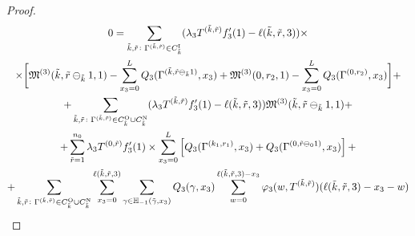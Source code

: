 \documentclass{report}
\begin{document}
\begin{proof}
\begin{multline}
\allowdisplaybreaks
 0 = \sum_{\tilde{k},\tilde{r}\colon \Gamma^{(\tilde{k}, \tilde{r})} \in C_{\tilde{k}}^{\mathrm{I}}} (\lambda_3 T^{(\tilde{k},\tilde{r})} f_3'(1) - \ell(\tilde{k},\tilde{r},3))\times \\ 
     \times \biggl[\mathfrak{M}^{(3)}(\tilde{k},\tilde{r}\ominus_{\tilde{k}} 1,1) - \sum_{x_3=0}^L Q_3(\Gamma^{(\tilde{k},\tilde{r}\ominus_{\tilde{k}} 1)},x_3)   +  \mathfrak{M}^{(3)}(0,r_2,1) -   \sum_{x_3=0}^L  Q_3(\Gamma^{(0,r_2)},x_3)  \biggr]
 +\\+ \sum_{\tilde{k},\tilde{r}\colon \Gamma^{(\tilde{k}, \tilde{r})} \in C_{\tilde{k}}^{\mathrm{O}}\cup C_{\tilde{k}}^{\mathrm{N}}} (\lambda_3 T^{(\tilde{k},\tilde{r})} f_3'(1) - \ell(\tilde{k},\tilde{r},3)) \mathfrak{M}^{(3)}(\tilde{k},\tilde{r}\ominus_{\tilde{k}} 1,1)   +\\+ \sum_{\tilde{r}=1}^{n_0} \lambda_3 T^{(0,\tilde{r})} f_3'(1)  \times \sum_{x_3=0}^{L} \left[ Q_3(\Gamma^{(k_1,r_1)},x_3) + Q_3(\Gamma^{(0,\tilde{r}\ominus_0 1)},x_3) \right]   +\\+   \sum_{\tilde{k},\tilde{r}\colon \Gamma^{(\tilde{k}, \tilde{r})} \in C_{\tilde{k}}^{\mathrm{O}}\cup C_{\tilde{k}}^{\mathrm{N}}} \sum_{x_3=0}^{\ell(\tilde{k},\tilde{r},3)}\sum_{\gamma \in {\mathbb H}_{-1}(\tilde{\gamma},x_3)} Q_3(\gamma,x_3) \sum_{w=0}^{\ell(\tilde{k},\tilde{r},3) - x_3} \varphi_3(w,T^{(\tilde{k},\tilde{r})}) (\ell(\tilde{k},\tilde{r},3)-x_3 - w)
 \label{neccessary:to:paste}
\end{multline}


\end{proof}
\end{document}

